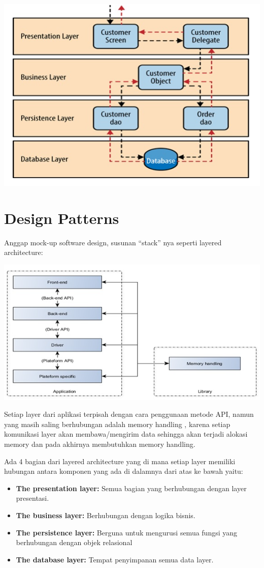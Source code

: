 \documentclass[a4paper,12pt]{article}
\begin{document}
\includegraphics{Img/Software Architecture Pattern.png}


\section*{Design Patterns}

Anggap mock-up software design, susunan “stack” nya seperti layered architecture:

\includegraphics{Img/Design Pattern.png}

Setiap layer dari aplikasi terpisah dengan cara penggunaan metode API, namun yang masih saling berhubungan adalah memory handling , karena setiap komunikasi layer akan membawa/mengirim data sehingga akan terjadi alokasi memory dan pada akhirnya membutuhkan memory handling.

Ada 4 bagian dari layered architecture yang di mana setiap layer memiliki hubungan antara komponen yang ada di dalamnya dari atas ke bawah yaitu:

\begin{itemize}
	\item \textbf{The presentation layer:} Semua bagian yang berhubungan dengan layer presentasi.
	\item \textbf{The business layer:} Berhubungan dengan logika bisnis.
	\item \textbf{The persistence layer:} Berguna untuk mengurusi semua fungsi yang berhubungan dengan objek relasional

	\item \textbf{The database layer:} Tempat penyimpanan semua data layer.
\end{itemize}
\end{document}
